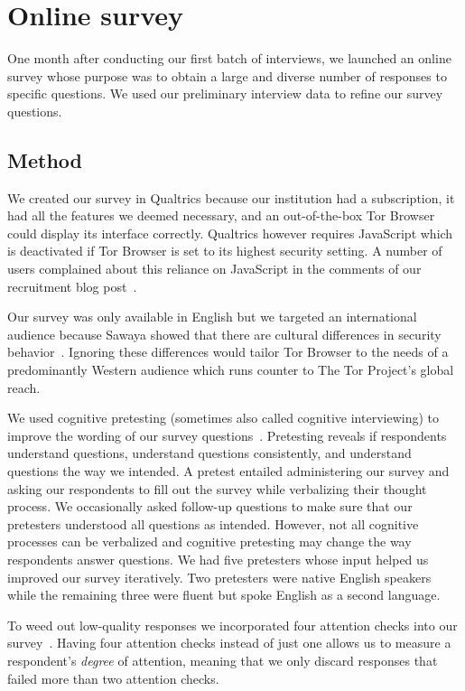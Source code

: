 \section{Online survey}
\label{sec:online-survey}

One month after conducting our first batch of interviews, we launched an online
survey whose purpose was to obtain a large and diverse number of responses to
specific questions.  We used our preliminary interview data to refine our survey
questions.

\subsection{Method}
\label{sec:survey-design}

We created our survey in Qualtrics because our institution had a subscription,
it had all the features we deemed necessary, and an out-of-the-box Tor Browser
could display its interface correctly.  Qualtrics however requires JavaScript
which is deactivated if Tor Browser is set to its highest security setting.  A
number of users complained about this reliance on JavaScript in the comments of
our recruitment blog post~\cite{Winter2017a}.

Our survey was only available in English but we targeted an international
audience because Sawaya \ea showed that there are cultural differences in
security behavior~\cite{Sawaya2017a}.  Ignoring these differences would
tailor Tor Browser to the needs of a predominantly Western audience which runs
counter to The Tor Project's global reach.

We used cognitive pretesting (sometimes also called cognitive interviewing) to
improve the wording of our survey questions~\cite{Collins2003a}.  Pretesting
reveals if respondents \first understand questions, \second understand questions
consistently, and \third understand questions the way we intended.  A pretest
entailed administering our survey and asking our respondents to fill out the
survey while verbalizing their thought process.  We occasionally asked follow-up
questions to make sure that our pretesters understood all questions as intended.
However, not all cognitive processes can be verbalized and cognitive pretesting
may change the way respondents answer questions.  We had five pretesters whose
input helped us improved our survey iteratively.  Two pretesters were native
English speakers while the remaining three were fluent but spoke English as a
second language.

To weed out low-quality responses we incorporated four attention checks into our
survey~\cite{Berinsky2014a}.  Having four attention checks instead of just one
allows us to measure a respondent's \emph{degree} of attention, meaning that we
only discard responses that failed more than two attention checks.

